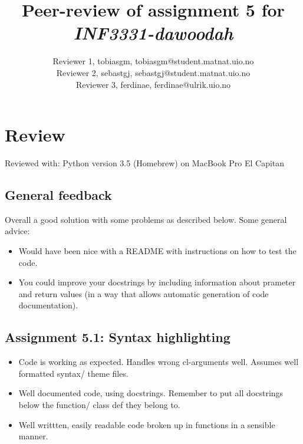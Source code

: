 \documentclass[a4paper]{article}
\title{Peer-review of assignment 5 for \textit{INF3331-dawoodah}}
\author{Reviewer 1, tobiasgm, {tobiasgm@student.matnat.uio.no} 
\\ Reviewer 2, sebastgj, {sebastgj@student.matnat.uio.no} 
\\ Reviewer 3, ferdinae, {ferdinae@ulrik.uio.no}}
\begin{document}
\maketitle

\section{Review \emph{}}\label{sec:review}

Reviewed with: Python version 3.5 (Homebrew) on MacBook Pro El Capitan

\subsection*{General feedback}
Overall a good solution with some problems as described below. Some general advice:
\begin{itemize}
  \item Would have been nice with a README with instructions on how to test the code.
  \item You could improve your docstrings by including information about prameter and return values (in a way that allows automatic generation of code documentation).
\end{itemize}

\subsection*{Assignment 5.1: Syntax highlighting}
\begin{itemize}
  \item Code is working as expected. Handles wrong cl-arguments well. Assumes well formatted syntax/ theme files.
  \item Well documented code, using docstrings. Remember to put all docstrings below the function/ class def they belong to.
  \item Well writtten, easily readable code broken up in functions in a sensible manner.
\end{itemize}

\end{document}

